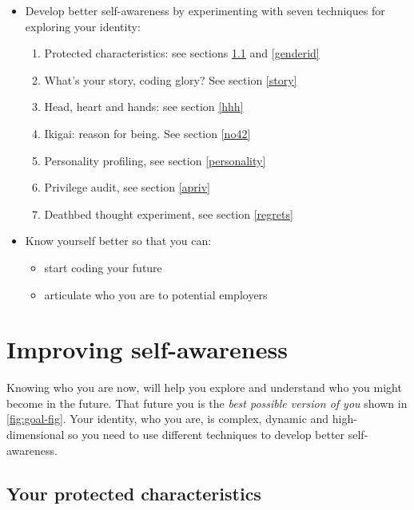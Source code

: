 \documentclass[
]{book}
\providecommand{\tightlist}{%
  \setlength{\itemsep}{0pt}\setlength{\parskip}{0pt}}
\begin{document}
\begin{itemize}
\tightlist
\item
  Develop better self-awareness by experimenting with seven techniques for exploring your identity:

  \begin{enumerate}
  \def\labelenumi{\arabic{enumi}.}
  \tightlist
  \item
    Protected characteristics: see sections \ref{protected} and \ref{genderid}
  \item
    What's your story, coding glory? See section \ref{story}
  \item
    Head, heart and hands: see section \ref{hhh}
  \item
    Ikigai: reason for being. See section \ref{no42}
  \item
    Personality profiling, see section \ref{personality}
  \item
    Privilege audit, see section \ref{apriv}
  \item
    Deathbed thought experiment, see section \ref{regrets}
  \end{enumerate}
\item
  Know yourself better so that you can:

  \begin{itemize}
  \tightlist
  \item
    start coding your future
  \item
    articulate who you are to potential employers
  \end{itemize}
\end{itemize}

\hypertarget{skynet}{%
\section{Improving self-awareness}\label{skynet}}

Knowing who you are now, will help you explore and understand who you might become in the future. That future you is the \emph{best possible version of you} shown in \ref{fig:goal-fig}. Your identity, who you are, is complex, dynamic and high-dimensional so you need to use different techniques to develop better self-awareness.

\hypertarget{protected}{%
\subsection{Your protected characteristics}\label{protected}}
\end{document}

